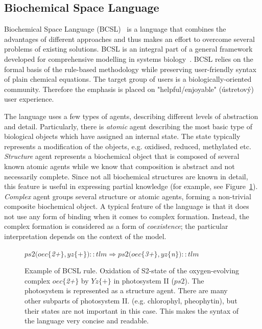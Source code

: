 \documentclass[11pt,a4paper]{report}
\begin{document}
\subsection{Biochemical Space Language}

Biochemical Space Language (BCSL)~\cite{trojak2018sasb} is a language that combines the advantages of different approaches and thus makes an effort to overcome several problems of existing solutions. BCSL is an integral part of a general framework developed for comprehensive modelling in systems biology~\cite{klement2013comprehensive,BCS}. BCSL relies on the formal basis of the rule-based methodology while preserving user-friendly syntax of plain chemical equations. The target group of users is a biologically-oriented community. Therefore the emphasis is placed on "helpful/enjoyable" (ústretový) user experience.

The language uses a few types of agents, describing different levels of abstraction and detail. Particularly, there is \emph{atomic} agent describing the most basic type of biological objects which have assigned an internal state. The state typically represents a modification of the objects, e.g. oxidised, reduced, methylated etc. \emph{Structure} agent represents a biochemical object that is composed of several known atomic agents while we know that composition is abstract and not necessarily complete. Since not all biochemical structures are known in detail, this feature is useful in expressing partial knowledge (for example, see Figure~\ref{ps2_rule}). \emph{Complex} agent groups several structure or atomic agents, forming a non-trivial composite biochemical object. A typical feature of the language is that it does not use any form of binding when it comes to complex formation. Instead, the complex formation is considered as a form of \emph{coexistence}; the particular interpretation depends on the context of the model.

\begin{figure}[!h]
	\begin{center}
		$ \mathit{ps2}(oec\{$\emph{2+}$\}, yz\{$+$\}){::}tlm \Rightarrow \mathit{ps2}(oec\{$\emph{3+}$\}, yz\{$\emph{n}$\}){::}tlm $
	\end{center}
	\caption{Example of BCSL rule. Oxidation of S2-state of the oxygen-evolving complex $oec\{$\emph{2+}$\}$ by $Yz\{+\}$ in photosystem II ($\mathit{ps2}$). The photosystem is represented as a structure agent. There are many other subparts of photosystem II. (e.g. chlorophyl, pheophytin), but their states are not important in this case. This makes the syntax of the language very concise and readable.}\label{ps2_rule}
\end{figure}
\end{document}
